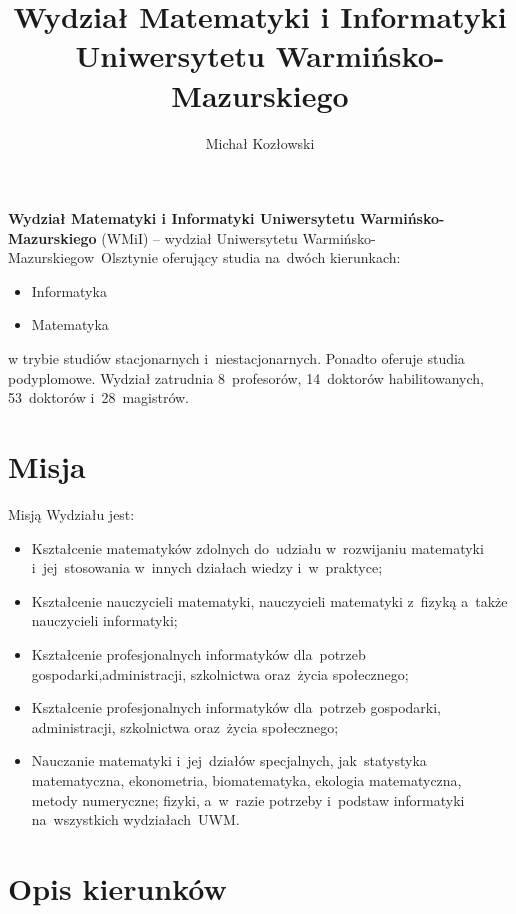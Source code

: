 ﻿\documentclass[a4paper,12pt]{article}
\begin{document}
\title{Wydział Matematyki i Informatyki Uniwersytetu Warmińsko-Mazurskiego}

\author{Michał Kozłowski}

\maketitle

\textbf{Wydział Matematyki i Informatyki Uniwersytetu Warmińsko-Mazurskiego} (WMiI) – wydział Uniwersytetu Warmińsko-Mazurskiego\linebreak w~Olsztynie oferujący studia na~dwóch kierunkach:

\begin{itemize}
\item Informatyka
\item Matematyka
\end{itemize}
w trybie studiów stacjonarnych i~niestacjonarnych. Ponadto oferuje studia podyplomowe.
Wydział zatrudnia 8~profesorów, 14~doktorów habilitowanych, 53~doktorów i~28~magistrów.


\tableofcontents


\section{Misja}

Misją Wydziału jest:
\begin{itemize}
	\item Kształcenie matematyków zdolnych do~udziału w~rozwijaniu matematyki i~jej~stosowania w~innych działach wiedzy i~w~praktyce;
	\item Kształcenie nauczycieli matematyki, nauczycieli matematyki z~fizyką a~także nauczycieli informatyki;
	\item Kształcenie profesjonalnych informatyków dla~potrzeb gospodarki,\linebreak administracji, szkolnictwa oraz~życia społecznego;
	\item Kształcenie profesjonalnych informatyków dla~potrzeb gospodarki, administracji, szkolnictwa oraz~życia społecznego;
	\item Nauczanie matematyki i~jej~działów specjalnych, jak~statystyka matematyczna, ekonometria, biomatematyka, ekologia matematyczna, metody numeryczne; fizyki, a~w~razie potrzeby i~podstaw informatyki na~wszystkich wydziałach~UWM.
\end{itemize}


\section{Opis kierunków}
\end{document}
